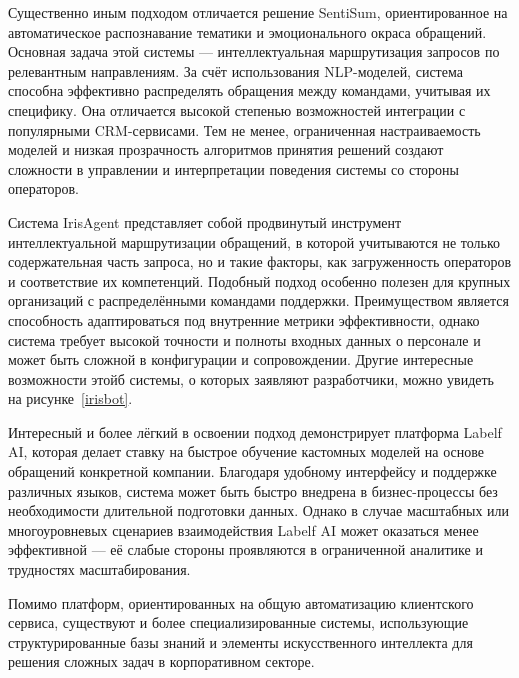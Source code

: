 Существенно иным подходом отличается решение SentiSum\cite{SentiSum}, ориентированное на автоматическое распознавание тематики и эмоционального окраса обращений. Основная задача этой системы — интеллектуальная маршрутизация запросов по релевантным направлениям. За счёт использования NLP-моделей, система способна эффективно распределять обращения между командами, учитывая их специфику. Она отличается высокой степенью возможностей интеграции с популярными CRM-сервисами. Тем не менее, ограниченная настраиваемость моделей и низкая прозрачность алгоритмов принятия решений создают сложности в управлении и интерпретации поведения системы со стороны операторов.


Система IrisAgent представляет собой продвинутый инструмент интеллектуальной маршрутизации обращений, в которой учитываются не только содержательная часть запроса, но и такие факторы, как загруженность операторов и соответствие их компетенций. Подобный подход особенно полезен для крупных организаций с распределёнными командами поддержки. Преимуществом является способность адаптироваться под внутренние метрики эффективности, однако система требует высокой точности и полноты входных данных о персонале и может быть сложной в конфигурации и сопровождении. Другие интересные возможности этойб системы, о которых заявляют разработчики, можно увидеть на рисунке~\ref{irisbot}.

Интересный и более лёгкий в освоении подход демонстрирует платформа Labelf AI\cite{Labelf}, которая делает ставку на быстрое обучение кастомных моделей на основе обращений конкретной компании. Благодаря удобному интерфейсу и поддержке различных языков, система может быть быстро внедрена в бизнес-процессы без необходимости длительной подготовки данных. Однако в случае масштабных или многоуровневых сценариев взаимодействия Labelf AI может оказаться менее эффективной — её слабые стороны проявляются в ограниченной аналитике и трудностях масштабирования.

Помимо платформ, ориентированных на общую автоматизацию клиентского сервиса, существуют и более специализированные системы, использующие структурированные базы знаний и элементы искусственного интеллекта для решения сложных задач в корпоративном секторе.


